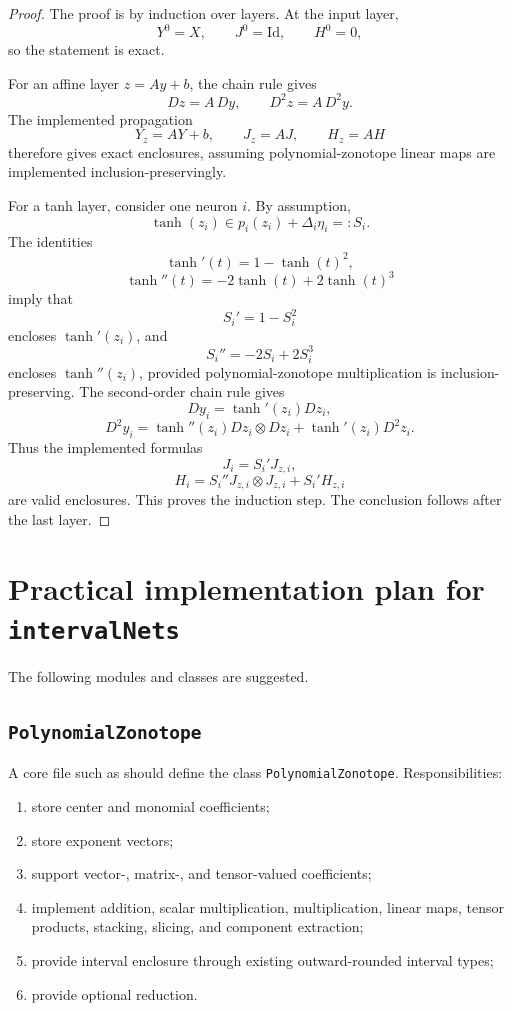 \documentclass[11pt]{article}
\newcommand{\Id}{\mathrm{Id}}
\begin{document}
\begin{proof}
The proof is by induction over layers. At the input layer,
\[
    Y^0=X,
    \qquad
    J^0=\Id,
    \qquad
    H^0=0,
\]
so the statement is exact.

For an affine layer \(z=Ay+b\), the chain rule gives
\[
    Dz=A\,Dy,
    \qquad
    D^2z=A\,D^2y.
\]
The implemented propagation
\[
    Y_z=AY+b,
    \qquad
    J_z=AJ,
    \qquad
    H_z=AH
\]
therefore gives exact enclosures, assuming polynomial-zonotope linear maps are implemented inclusion-preservingly.

For a tanh layer, consider one neuron \(i\). By assumption,
\[
    \tanh(z_i)\in p_i(z_i)+\Delta_i\eta_i=:S_i.
\]
The identities
\[
    \tanh'(t)=1-\tanh(t)^2,
\]
\[
    \tanh''(t)=-2\tanh(t)+2\tanh(t)^3
\]
imply that
\[
    S_i'=1-S_i^2
\]
encloses \(\tanh'(z_i)\), and
\[
    S_i''=-2S_i+2S_i^3
\]
encloses \(\tanh''(z_i)\), provided polynomial-zonotope multiplication is inclusion-preserving. The second-order chain rule gives
\[
    Dy_i=\tanh'(z_i)Dz_i,
\]
\[
    D^2y_i=\tanh''(z_i)Dz_i\otimes Dz_i+\tanh'(z_i)D^2z_i.
\]
Thus the implemented formulas
\[
    J_i=S_i'J_{z,i},
\]
\[
    H_i=S_i''J_{z,i}\otimes J_{z,i}+S_i'H_{z,i}
\]
are valid enclosures. This proves the induction step. The conclusion follows after the last layer.
\end{proof}

\section{Practical implementation plan for \texttt{intervalNets}}

The following modules and classes are suggested.

\subsection{\texttt{PolynomialZonotope}}

A core file such as  should define the class \texttt{PolynomialZonotope}. Responsibilities:
\begin{enumerate}[label=(\roman*)]
    \item store center and monomial coefficients;
    \item store exponent vectors;
    \item support vector-, matrix-, and tensor-valued coefficients;
    \item implement addition, scalar multiplication, multiplication, linear maps, tensor products, stacking, slicing, and component extraction;
    \item provide interval enclosure through existing outward-rounded interval types;
    \item provide optional reduction.
\end{enumerate}
\end{document}
